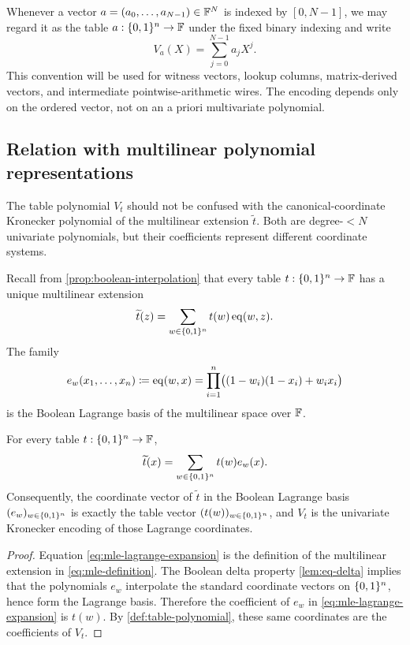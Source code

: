 \begin{remark}
\label{rem:vector-table-polynomial}
Whenever a vector $a=(a_0,\ldots,a_{N-1})\in\mathbb{F}^N$ is indexed by $[0,N-1]$, we may regard it as the table $a:\{0,1\}^n\to\mathbb{F}$ under the fixed binary indexing and write
\[
  V_a(X)=\sum_{j=0}^{N-1}a_jX^j.
\]
This convention will be used for witness vectors, lookup columns, matrix-derived vectors, and intermediate pointwise-arithmetic wires.  The encoding depends only on the ordered vector, not on an a priori multivariate polynomial.
\end{remark}

\subsection{Relation with multilinear polynomial representations}
\label{sec:table-vs-multilinear}

The table polynomial $V_t$ should not be confused with the canonical-coordinate Kronecker polynomial of the multilinear extension $\widetilde t$.  Both are degree-$<N$ univariate polynomials, but their coefficients represent different coordinate systems.

Recall from \cref{prop:boolean-interpolation} that every table $t:\{0,1\}^n\to\mathbb{F}$ has a unique multilinear extension
\[
  \widetilde t(z)
  =\sum_{w\in\{0,1\}^n}t(w)\operatorname{eq}(w,z).
\]
The family
\begin{equation}
  e_w(x_1,\ldots,x_n)
  \coloneqq
  \operatorname{eq}(w,x)
  =\prod_{i=1}^{n}\bigl((1-w_i)(1-x_i)+w_ix_i\bigr)
  \label{eq:boolean-lagrange-basis}
\end{equation}
is the Boolean Lagrange basis of the multilinear space over $\mathbb{F}$.

\begin{proposition}
\label{prop:table-lagrange-coordinates}
For every table $t:\{0,1\}^n\to\mathbb{F}$,
\begin{equation}
  \widetilde t(x)
  =\sum_{w\in\{0,1\}^n}t(w)e_w(x).
  \label{eq:mle-lagrange-expansion}
\end{equation}
Consequently, the coordinate vector of $\widetilde t$ in the Boolean Lagrange basis $(e_w)_{w\in\{0,1\}^n}$ is exactly the table vector $(t(w))_{w\in\{0,1\}^n}$, and $V_t$ is the univariate Kronecker encoding of those Lagrange coordinates.
\end{proposition}

\begin{proof}
Equation \eqref{eq:mle-lagrange-expansion} is the definition of the multilinear extension in \eqref{eq:mle-definition}.  The Boolean delta property \cref{lem:eq-delta} implies that the polynomials $e_w$ interpolate the standard coordinate vectors on $\{0,1\}^n$, hence form the Lagrange basis.  Therefore the coefficient of $e_w$ in \eqref{eq:mle-lagrange-expansion} is $t(w)$.  By \cref{def:table-polynomial}, these same coordinates are the coefficients of $V_t$.
\end{proof}

